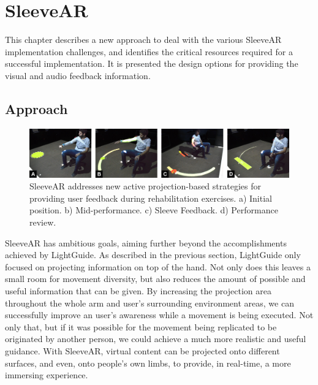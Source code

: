 \chapter{SleeveAR}
\label{sec:sleevear}


This chapter describes a new approach to deal with the various SleeveAR implementation challenges, and  identifies the critical resources required for a successful implementation. It is presented the design options for providing the visual and audio feedback information.



\section{Approach}
\label{sec:sleevear:approach}

\begin{figure}[!t]
    \begin{center}
        \includegraphics[width=\textwidth]{imgs/impl/teaser.jpg}
    \end{center}
    \caption{SleeveAR addresses new active projection-based strategies for providing user feedback during rehabilitation exercises. a) Initial position. b) Mid-performance. c) Sleeve Feedback. d) Performance review.}
    \label{fig:teaser}
\end{figure}

SleeveAR has ambitious goals, aiming further beyond the accomplishments achieved by LightGuide. 
As described in the previous section, LightGuide only focused on projecting information on top of the hand. Not only does this leaves a small room for movement diversity, but also reduces the amount of possible and useful information that can be given.
By increasing the projection area throughout the whole arm and user's surrounding environment areas, we can successfully improve an user's awareness while a movement is being executed. 
 Not only that, but if it was possible for the movement being replicated to be originated by another person, we could achieve a much more realistic and useful guidance.
With SleeveAR, virtual content can be projected onto different surfaces, and even, onto people's own limbs, to provide, in real-time, a more immersing experience. 

